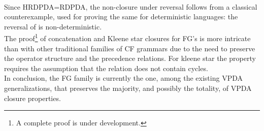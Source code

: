 \documentclass[3p,11pt]{elsarticle}
\begin{document}
\\
Since HRDPDA=RDPDA, the non-closure under reversal follows from a classical counterexample, used for proving the same for deterministic languages: the reversal of  is non-deterministic.
\\
The proof\footnote{A complete proof is under development.}  of concatenation and Kleene star closures for FG's is more intricate than with other traditional families of CF grammars due to the need to preserve the operator structure and the precedence relations. For kleene star the property requires the assumption that the  relation does not contain cycles.
\\
In conclusion, the FG family is currently the one, among the existing VPDA generalizations, that preserves the majority, and possibly the totality, of VPDA closure properties.
\end{document}
